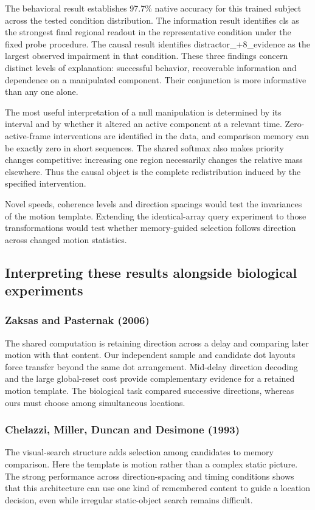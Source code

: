 \documentclass[11pt]{article}
\begin{document}
The behavioral result establishes 97.7\% native accuracy for this trained subject across the tested condition distribution. The information result identifies cls as the strongest final regional readout in the representative condition under the fixed probe procedure. The causal result identifies distractor\_\allowbreak{}+8\_\allowbreak{}evidence as the largest observed impairment in that condition. These three findings concern distinct levels of explanation: successful behavior, recoverable information and dependence on a manipulated component. Their conjunction is more informative than any one alone.

The most useful interpretation of a null manipulation is determined by its interval and by whether it altered an active component at a relevant time. Zero-active-frame interventions are identified in the data, and comparison memory can be exactly zero in short sequences. The shared softmax also makes priority changes competitive: increasing one region necessarily changes the relative mass elsewhere. Thus the causal object is the complete redistribution induced by the specified intervention.

Novel speeds, coherence levels and direction spacings would test the invariances of the motion template. Extending the identical-array query experiment to those transformations would test whether memory-guided selection follows direction across changed motion statistics.

\subsection{Interpreting these results alongside biological experiments}
\subsubsection{Zaksas and Pasternak (2006)}
The shared computation is retaining direction across a delay and comparing later motion with that content. Our independent sample and candidate dot layouts force transfer beyond the same dot arrangement. Mid-delay direction decoding and the large global-reset cost provide complementary evidence for a retained motion template. The biological task compared successive directions, whereas ours must choose among simultaneous locations. \cite{bio_zaksas}

\subsubsection{Chelazzi, Miller, Duncan and Desimone (1993)}
The visual-search structure adds selection among candidates to memory comparison. Here the template is motion rather than a complex static picture. The strong performance across direction-spacing and timing conditions shows that this architecture can use one kind of remembered content to guide a location decision, even while irregular static-object search remains difficult. \cite{bio_chelazzi}
\end{document}
